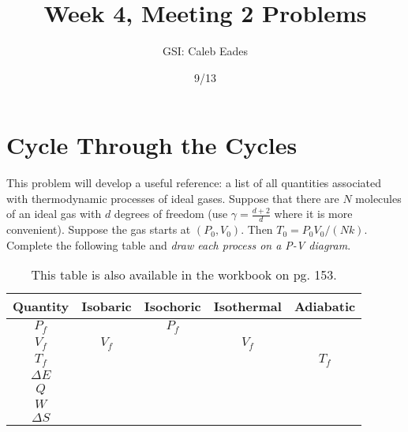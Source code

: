 \documentclass{article}
\begin{document}
\title{Week 4, Meeting 2 Problems}
\author{GSI: Caleb Eades}
\date{9/13}
\maketitle

\section{Cycle Through the Cycles}

This problem will develop a useful reference: a list of all quantities associated with thermodynamic processes of ideal gases. Suppose that there are $N$ molecules of an ideal gas with $d$ degrees of freedom (use $\gamma = \frac{d+2}{d}$ where it is more convenient). Suppose the gas starts at $(P_0,V_0)$. Then $T_0 = P_0V_0/(Nk)$. Complete the following table and \textit{draw each process on a P-V diagram}.

\def\arraystretch{2.5}
\begin{table}[h]
	\begin{center}
	\caption{This table is also available in the workbook on pg. 153.}
	
	\begin{tabular}{| >{\Large}c|c|c|c|c|}
		\hline
		\normalsize{\textbf{Quantity}} & \textbf{Isobaric} & \textbf{Isochoric} & \textbf{Isothermal} & \textbf{Adiabatic} \\ \hline
		$P_f$             &                   & $P_f$                  &                     &                    \\ \hline
		$V_f$             & $V_f$             &                        & $V_f$               &                    \\ \hline
		$T_f$             &                   &                        &                     & $T_f$              \\ \hline
		$\Delta E$        &                   &                        &                     &                    \\ \hline
		$Q$               &                   &                        &                     &                    \\ \hline
		$W$               &                   &                        &                     &                    \\ \hline
		$\Delta S$        &                   &                        &                     &                    \\ \hline
	\end{tabular}
	\end{center}
\end{table}
\end{document}

